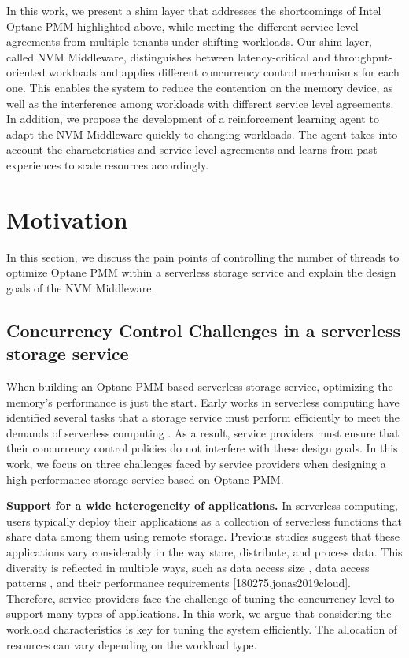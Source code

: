 In this work, we present a shim layer that addresses the shortcomings of Intel Optane PMM highlighted above, while meeting the different service level agreements from multiple tenants under shifting workloads. Our shim layer, called NVM Middleware, distinguishes between latency-critical and throughput-oriented workloads and applies different concurrency control mechanisms for each one. This enables the system to reduce the contention on the memory device, as well as the interference among workloads with different service level agreements. In addition, we propose the development of a reinforcement learning agent to adapt the NVM Middleware quickly to changing workloads. The agent takes into account the characteristics and service level agreements and learns from past experiences to scale resources accordingly.


\section{Motivation}
In this section, we discuss the pain points of controlling the number of threads to optimize Optane PMM within a serverless storage service and explain the design goals of the NVM Middleware.

\subsection{Concurrency Control Challenges in a serverless storage service}

When building an Optane PMM based serverless storage service, optimizing the memory’s performance is just the start. Early works in serverless computing have identified several tasks that a storage service must perform efficiently to meet the demands of serverless computing \cite{180275,jonas2019cloud,klimovic2018understanding,klimovic2018pocket,wu2019autoscaling,romero2021faat}. As a result, service providers must ensure that their concurrency control policies do not interfere with these design goals. In this work, we focus on three challenges faced by service providers when designing a high-performance storage service based on Optane PMM.

\textbf{Support for a wide heterogeneity of applications.} In serverless computing, users typically deploy their applications as a collection of serverless functions that share data among them using remote storage. Previous studies suggest that these applications vary considerably in the way store, distribute, and process data. This diversity is reflected in multiple ways, such as data access size \cite{klimovic2018pocket,romero2021faat}, data access patterns \cite{romero2021faat}, and their performance requirements [180275,jonas2019cloud]. Therefore, service providers face the challenge of tuning the concurrency level to support many types of applications. In this work, we argue that considering the workload characteristics is key for tuning the system efficiently. The allocation of resources can vary depending on the workload type.

